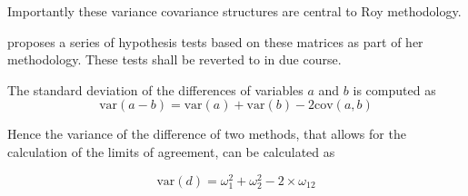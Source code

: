 \documentclass[12pt, a4paper]{article}
\theoremstyle{plain}
\theoremstyle{definition}
\theoremstyle{remark}
\begin{document}
Importantly these variance covariance structures are central to Roy methodology.

\citet{Roy} proposes a series of hypothesis tests based on these matrices as part of her methodology. These tests shall be reverted to in due course.

The standard deviation of the differences of variables $a$ and $b$ is computed as
\[
\mbox{var}(a - b) = \mbox{var} ( a )  + \mbox{var} ( b ) - 2\mbox{cov} ( a ,b )
\]

Hence the variance of the difference of two methods, that allows for the calculation of the limits of agreement, can be calculated as

\[
\mbox{var}(d) = \omega^2_1  + \omega^2_2 - 2 \times \omega_12
\]






\end{document}
